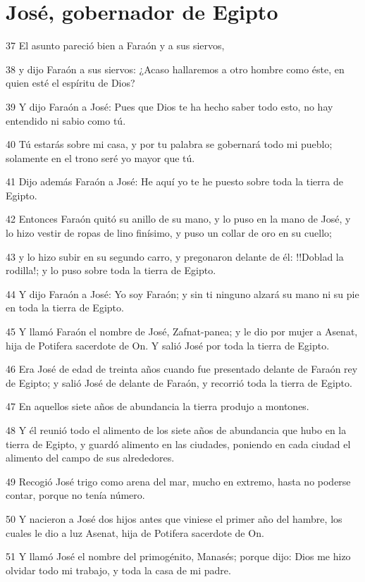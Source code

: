 \section*{José, gobernador de Egipto}

\par 37 El asunto pareció bien a Faraón y a sus siervos,
\par 38 y dijo Faraón a sus siervos: ¿Acaso hallaremos a otro hombre como éste, en quien esté el espíritu de Dios?
\par 39 Y dijo Faraón a José: Pues que Dios te ha hecho saber todo esto, no hay entendido ni sabio como tú.
\par 40 Tú estarás sobre mi casa, y por tu palabra se gobernará todo mi pueblo; solamente en el trono seré yo mayor que tú.
\par 41 Dijo además Faraón a José: He aquí yo te he puesto sobre toda la tierra de Egipto.
\par 42 Entonces Faraón quitó su anillo de su mano, y lo puso en la mano de José, y lo hizo vestir de ropas de lino finísimo, y puso un collar de oro en su cuello;
\par 43 y lo hizo subir en su segundo carro, y pregonaron delante de él: !!Doblad la rodilla!; y lo puso sobre toda la tierra de Egipto.
\par 44 Y dijo Faraón a José: Yo soy Faraón; y sin ti ninguno alzará su mano ni su pie en toda la tierra de Egipto.
\par 45 Y llamó Faraón el nombre de José, Zafnat-panea; y le dio por mujer a Asenat, hija de Potifera sacerdote de On. Y salió José por toda la tierra de Egipto.
\par 46 Era José de edad de treinta años cuando fue presentado delante de Faraón rey de Egipto; y salió José de delante de Faraón, y recorrió toda la tierra de Egipto.
\par 47 En aquellos siete años de abundancia la tierra produjo a montones.
\par 48 Y él reunió todo el alimento de los siete años de abundancia que hubo en la tierra de Egipto, y guardó alimento en las ciudades, poniendo en cada ciudad el alimento del campo de sus alrededores.
\par 49 Recogió José trigo como arena del mar, mucho en extremo, hasta no poderse contar, porque no tenía número.
\par 50 Y nacieron a José dos hijos antes que viniese el primer año del hambre, los cuales le dio a luz Asenat, hija de Potifera sacerdote de On.
\par 51 Y llamó José el nombre del primogénito, Manasés; porque dijo: Dios me hizo olvidar todo mi trabajo, y toda la casa de mi padre.
